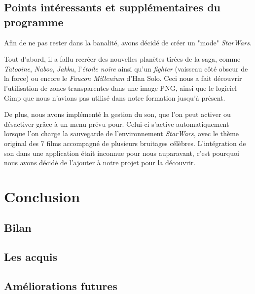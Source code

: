 \documentclass[a4paper,10pt]{article}
\begin{document}
\newpage
\subsection{Points intéressants et supplémentaires du programme}
Afin de ne pas rester dans la banalité, avons décidé de créer un "mode" \textit{StarWars}. 

Tout d'abord, il a fallu recréer des nouvelles planètes tirées de la saga, comme \textit{Tatooine}, \textit{Naboo}, \textit{Jakku}, l'\textit{étoile noire} ainsi qu'un \textit{fighter} (vaisseau côté obscur de la force) ou encore le \textit{Faucon Millenium} d'Han Solo. Ceci nous a fait découvrir l'utilisation de zones transparentes dans une image PNG, ainsi que le logiciel Gimp que nous n'avions pas utilisé dans notre formation jusqu'à présent.

De plus, nous avons implémenté la gestion du son, que l'on peut activer ou désactiver grâce à un menu prévu pour. Celui-ci s'active automatiquement lorsque l'on charge la sauvegarde de l'environnement \textit{StarWars}, avec le thème original des 7 films accompagné de plusieurs bruitages célèbres. L'intégration de son dans une application était inconnue pour nous auparavant, c'est pourquoi nous avons décidé de l'ajouter à notre projet pour la découvrir.

\newpage
\section{Conclusion}
\subsection{Bilan}

\subsection{Les acquis}

\subsection{Améliorations futures}
\end{document}
